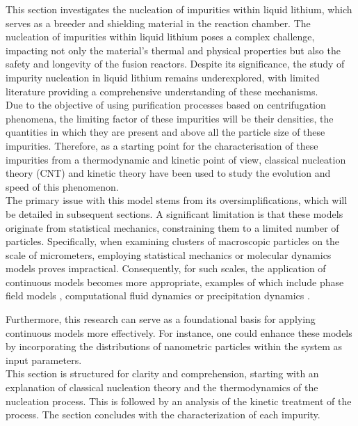 This section investigates the nucleation of impurities within liquid lithium, which serves as a breeder and shielding material in the reaction chamber. The nucleation of impurities within liquid lithium poses a 
complex challenge, impacting not only the material's thermal and physical properties but also the safety and longevity of the fusion reactors. Despite its significance, 
the study of impurity nucleation in liquid lithium remains underexplored, with limited literature providing a comprehensive understanding of these mechanisms.
\\
Due to the objective of using purification processes based on centrifugation phenomena, the limiting factor of these impurities will be their densities, the quantities in which 
they are present and above all the particle size of these impurities. Therefore, as a starting point for the characterisation of these impurities from a thermodynamic and kinetic point of view, 
classical nucleation theory (CNT) and kinetic theory have been used to study the evolution and speed of this phenomenon.
\\
The primary issue with this model stems from its oversimplifications, which will be detailed in subsequent sections. A significant limitation is that these models originate from statistical mechanics, 
constraining them to a limited number of particles. Specifically, when examining clusters of macroscopic particles on the scale of micrometers, employing statistical mechanics or molecular dynamics models proves 
impractical. Consequently, for such scales, the application of continuous models becomes more appropriate, examples of which include phase field models \cite{Zhu2004,Garcia}, computational fluid dynamics or precipitation dynamics \cite{Sommitsch}.

Furthermore, this research can serve as a foundational basis for applying continuous models more effectively. For instance, one could enhance these models by incorporating the distributions of nanometric particles within the system as input parameters. 
\\
This section is structured for clarity and comprehension, starting with an explanation of classical nucleation theory and the thermodynamics of the nucleation process. This is followed by an analysis 
of the kinetic treatment of the process. 
The section concludes with the characterization of each impurity.

